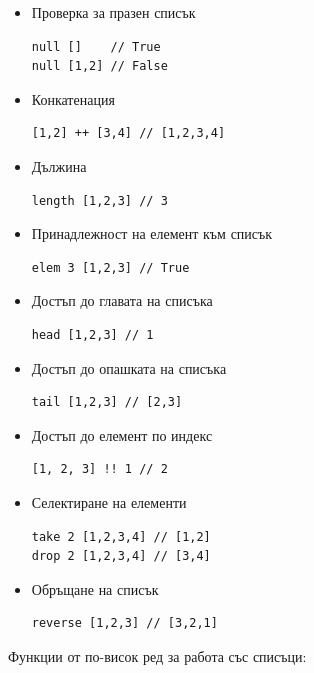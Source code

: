 \documentclass{article}
\begin{document}
\begin{itemize}
    \item Проверка за празен списък
\begin{lstlisting}[style=cpp]
null []    // True
null [1,2] // False
\end{lstlisting}
    \item Конкатенация
\begin{lstlisting}[style=cpp]
[1,2] ++ [3,4] // [1,2,3,4]
\end{lstlisting}
    \item Дължина
\begin{lstlisting}[style=cpp]
length [1,2,3] // 3
\end{lstlisting}
    \item Принадлежност на елемент към списък
\begin{lstlisting}[style=cpp]
elem 3 [1,2,3] // True
\end{lstlisting}
    \item Достъп до главата на списъка
\begin{lstlisting}[style=cpp]
head [1,2,3] // 1
\end{lstlisting}
    \item Достъп до опашката на списъка
\begin{lstlisting}[style=cpp]
tail [1,2,3] // [2,3]
\end{lstlisting}
    \item Достъп до елемент по индекс
\begin{lstlisting}[style=cpp]
[1, 2, 3] !! 1 // 2
\end{lstlisting}
    \item Селектиране на елементи
\begin{lstlisting}[style=cpp]
take 2 [1,2,3,4] // [1,2]
drop 2 [1,2,3,4] // [3,4]
\end{lstlisting}
    \item Обръщане на списък
\begin{lstlisting}[style=cpp]
reverse [1,2,3] // [3,2,1]
\end{lstlisting}
\end{itemize}
Функции от по-висок ред за работа със списъци:
\end{document}
